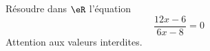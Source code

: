 
\begin{exercice}\label{exosmath-0224}

Résoudre dans \( \eR\) l'équation
\begin{equation}
    \frac{ 12x-6 }{ 6x-8 }=0
\end{equation}
Attention aux valeurs interdites.

\end{exercice}
